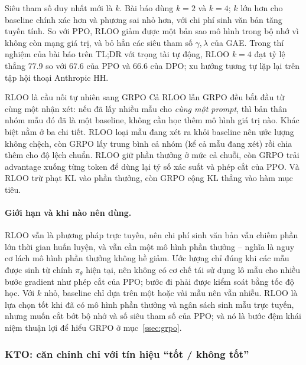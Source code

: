 Siêu tham số duy nhất mới là \( k \). Bài báo dùng \( k = 2 \) và \( k = 4 \); \( k \) lớn hơn cho baseline chính xác hơn và phương sai nhỏ hơn, với chi phí sinh văn bản tăng tuyến tính. So với PPO, RLOO giảm được một bản sao mô hình trong bộ nhớ vì không còn mạng giá trị, và bỏ hẳn các siêu tham số \( \gamma, \lambda \) của GAE. Trong thí nghiệm của bài báo trên TL;DR với trọng tài tự động, RLOO \( k=4 \) đạt tỷ lệ thắng 77.9 so với 67.6 của PPO và 66.6 của DPO; xu hướng tương tự lặp lại trên tập hội thoại Anthropic HH.

\begin{keyidea}{RLOO là cầu nối tự nhiên sang GRPO}
Cả RLOO lẫn GRPO đều bắt đầu từ cùng một nhận xét: nếu đã lấy nhiều mẫu cho \emph{cùng một prompt}, thì bản thân nhóm mẫu đó đã là một baseline, không cần học thêm mô hình giá trị nào. Khác biệt nằm ở ba chi tiết. RLOO loại mẫu đang xét ra khỏi baseline nên ước lượng không chệch, còn GRPO lấy trung bình cả nhóm (kể cả mẫu đang xét) rồi chia thêm cho độ lệch chuẩn. RLOO giữ phần thưởng ở mức cả chuỗi, còn GRPO trải advantage xuống từng token để dùng lại tỷ số xác suất và phép cắt của PPO. Và RLOO trừ phạt KL vào phần thưởng, còn GRPO cộng KL thẳng vào hàm mục tiêu.
\end{keyidea}

\paragraph{Giới hạn và khi nào nên dùng.}
RLOO vẫn là phương pháp trực tuyến, nên chi phí sinh văn bản vẫn chiếm phần lớn thời gian huấn luyện, và vẫn cần một mô hình phần thưởng -- nghĩa là nguy cơ lách mô hình phần thưởng không hề giảm. Ước lượng chỉ đúng khi các mẫu được sinh từ chính \( \pi_{\theta} \) hiện tại, nên không có cơ chế tái sử dụng lô mẫu cho nhiều bước gradient như phép cắt của PPO; bước đi phải được kiểm soát bằng tốc độ học. Với \( k \) nhỏ, baseline chỉ dựa trên một hoặc vài mẫu nên vẫn nhiễu. RLOO là lựa chọn tốt khi đã có mô hình phần thưởng và ngân sách sinh mẫu trực tuyến, nhưng muốn cắt bớt bộ nhớ và số siêu tham số của PPO; và nó là bước đệm khái niệm thuận lợi để hiểu GRPO ở mục~\ref{ssec:grpo}.

\subsubsection{KTO: căn chỉnh chỉ với tín hiệu “tốt / không tốt”}
\label{ssec:kto}

